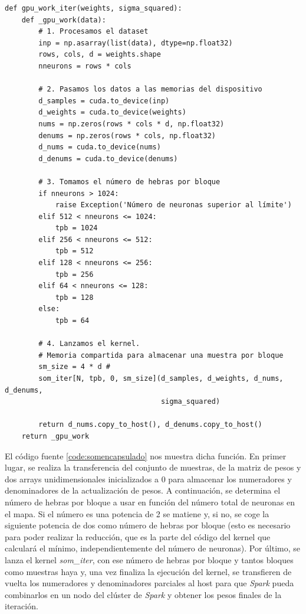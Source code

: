 \begin{code}
\begin{verbatim}
def gpu_work_iter(weights, sigma_squared):
    def _gpu_work(data):
        # 1. Procesamos el dataset
        inp = np.asarray(list(data), dtype=np.float32)
        rows, cols, d = weights.shape
        nneurons = rows * cols
        
        # 2. Pasamos los datos a las memorias del dispositivo
        d_samples = cuda.to_device(inp)
        d_weights = cuda.to_device(weights)
        nums = np.zeros(rows * cols * d, np.float32)
        denums = np.zeros(rows * cols, np.float32)
        d_nums = cuda.to_device(nums)
        d_denums = cuda.to_device(denums)
        
        # 3. Tomamos el número de hebras por bloque
        if nneurons > 1024:
            raise Exception('Número de neuronas superior al límite')
        elif 512 < nneurons <= 1024:
            tpb = 1024
        elif 256 < nneurons <= 512:
            tpb = 512
        elif 128 < nneurons <= 256:
            tpb = 256
        elif 64 < nneurons <= 128:
            tpb = 128
        else:
            tpb = 64
            
        # 4. Lanzamos el kernel.
        # Memoria compartida para almacenar una muestra por bloque
        sm_size = 4 * d # 
        som_iter[N, tpb, 0, sm_size](d_samples, d_weights, d_nums, d_denums,
                                     sigma_squared)
        
        return d_nums.copy_to_host(), d_denums.copy_to_host()
    return _gpu_work
\end{verbatim}
\label{code:somencapsulado}
\end{code}

El código fuente \ref{code:somencapsulado} nos muestra dicha función. En primer lugar, se realiza la transferencia del conjunto de muestras, de la matriz de pesos y dos arrays unidimensionales inicializados a 0 para almacenar los numeradores y denominadores de la actualización de pesos. A continuación, se determina el número de hebras por bloque a usar en función del número total de neuronas en el mapa. Si el número es una potencia de 2 se matiene y, si no, se coge la siguiente potencia de dos como número de hebras por bloque (esto es necesario para poder realizar la reducción, que es la parte del código del kernel que calculará el mínimo, independientemente del número de neuronas). Por último, se lanza el kernel \textit{som\_iter}, con ese número de hebras por bloque y tantos bloques como muestras haya y, una vez finaliza la ejecución del kernel, se transfieren de vuelta los numeradores y denominadores parciales al host para que \textit{Spark} pueda combinarlos en un nodo del clúster de \textit{Spark} y obtener los pesos finales de la iteración. 

